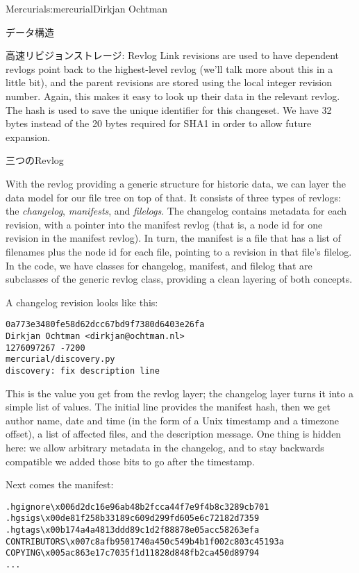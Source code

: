 \begin{aosachapter}{Mercurial}{s:mercurial}{Dirkjan Ochtman}
\begin{aosasect1}{データ構造}
\begin{aosasect2}{高速リビジョンストレージ: Revlog}
Link revisions are used to have dependent revlogs point back to the
highest-level revlog (we'll talk more about this in a little bit), and
the parent revisions are stored using the local integer revision
number. Again, this makes it easy to look up their data in the
relevant revlog. The hash is used to save the unique identifier for
this changeset. We have 32 bytes instead of the 20 bytes required for
SHA1 in order to allow future expansion.

\end{aosasect2}

\begin{aosasect2}{三つのRevlog}

With the revlog providing a generic structure for historic data, we
can layer the data model for our file tree on top of that. It consists
of three types of revlogs: the \emph{changelog}, \emph{manifests}, and
\emph{filelogs}. The changelog contains metadata for each revision,
with a pointer into the manifest revlog (that is, a node id for one
revision in the manifest revlog). In turn, the manifest is a file that
has a list of filenames plus the node id for each file, pointing to a
revision in that file's filelog. In the code, we have classes for
changelog, manifest, and filelog that are subclasses of the generic
revlog class, providing a clean layering of both concepts.


A changelog revision looks like this:

\begin{verbatim}
0a773e3480fe58d62dcc67bd9f7380d6403e26fa
Dirkjan Ochtman <dirkjan@ochtman.nl>
1276097267 -7200
mercurial/discovery.py
discovery: fix description line
\end{verbatim}

\noindent This is the value you get from the revlog layer; the changelog layer
turns it into a simple list of values. The initial line provides the
manifest hash, then we get author name, date and time (in the form of
a Unix timestamp and a timezone offset), a list of affected files, and
the description message. One thing is hidden here: we allow arbitrary
metadata in the changelog, and to stay backwards compatible we added
those bits to go after the timestamp.

Next comes the manifest:

\begin{verbatim}
.hgignore\x006d2dc16e96ab48b2fcca44f7e9f4b8c3289cb701
.hgsigs\x00de81f258b33189c609d299fd605e6c72182d7359
.hgtags\x00b174a4a4813ddd89c1d2f88878e05acc58263efa
CONTRIBUTORS\x007c8afb9501740a450c549b4b1f002c803c45193a
COPYING\x005ac863e17c7035f1d11828d848fb2ca450d89794
...
\end{verbatim}


\end{aosasect2}
\end{aosasect1}
\end{aosachapter}
